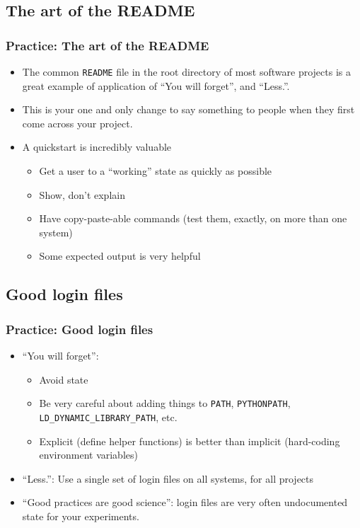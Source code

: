 \documentclass{beamer}
\begin{document}
\subsection{The art of the README}
\begin{frame}[fragile]
\frametitle{Practice: The art of the README}
  \begin{itemize}
    \item The common \texttt{README} file in the root directory of most software projects is a great example of application of ``You will forget'', and ``Less.''.
    \item This is your one and only change to say something to people when they first come across your project.
    \item A quickstart is incredibly valuable
      \begin{itemize}
        \item Get a user to a ``working'' state as quickly as possible
        \item Show, don't explain
        \item Have copy-paste-able commands (test them, exactly, on more than one system)
        \item Some expected output is very helpful
      \end{itemize}
    \end{itemize}
\end{frame}

\subsection{Good login files}
\begin{frame}[fragile]
\frametitle{Practice: Good login files}
\begin{itemize}
  \item ``You will forget'':
    \begin{itemize}
      \item Avoid state
  \item Be very careful about adding things to \lstinline{PATH}, \lstinline{PYTHONPATH}, \lstinline{LD_DYNAMIC_LIBRARY_PATH}, etc.
  \item Explicit (define helper functions) is better than implicit (hard-coding environment variables)
    \end{itemize}
  \item ``Less.'': Use a single set of login files on all systems, for all projects
  \item ``Good practices are good science'': login files are very often undocumented state for your experiments.
\end{itemize}
\end{frame}
\end{document}
